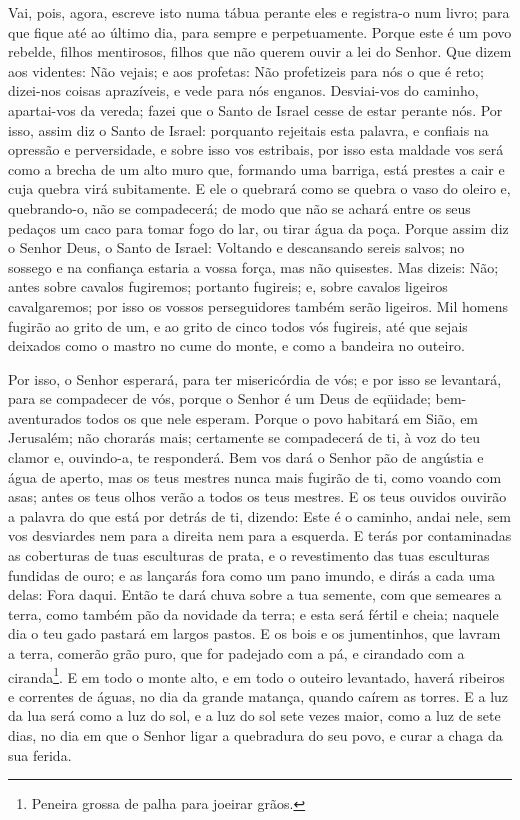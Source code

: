 Vai, pois, agora, escreve isto numa tábua perante eles e
registra-o num livro; para que fique até ao último dia, para sempre
e perpetuamente. Porque este é um povo rebelde, filhos
mentirosos, filhos que não querem ouvir a lei do Senhor. Que
dizem aos videntes: Não vejais; e aos profetas: Não profetizeis para
nós o que é reto; dizei-nos coisas aprazíveis, e vede para nós
enganos. Desviai-vos do caminho, apartai-vos da vereda; fazei
que o Santo de Israel cesse de estar perante nós. Por isso,
assim diz o Santo de Israel: porquanto rejeitais esta palavra, e
confiais na opressão e perversidade, e sobre isso vos estribais,
por isso esta maldade vos será como a brecha de um alto muro
que, formando uma barriga, está prestes a cair e cuja quebra virá
subitamente. E ele o quebrará como se quebra o vaso do oleiro
e, quebrando-o, não se compadecerá; de modo que não se achará entre
os seus pedaços um caco para tomar fogo do lar, ou tirar água da
poça. Porque assim diz o Senhor Deus, o Santo de Israel:
Voltando e descansando sereis salvos; no sossego e na confiança
estaria a vossa força, mas não quisestes. Mas dizeis: Não;
antes sobre cavalos fugiremos; portanto fugireis; e, sobre cavalos
ligeiros cavalgaremos; por isso os vossos perseguidores também serão
ligeiros. Mil homens fugirão ao grito de um, e ao grito de
cinco todos vós fugireis, até que sejais deixados como o mastro no
cume do monte, e como a bandeira no outeiro.

Por isso, o Senhor esperará, para ter misericórdia de vós; e por
isso se levantará, para se compadecer de vós, porque o Senhor é um
Deus de eqüidade; bem-aventurados todos os que nele esperam.
Porque o povo habitará em Sião, em Jerusalém; não chorarás
mais; certamente se compadecerá de ti, à voz do teu clamor e,
ouvindo-a, te responderá. Bem vos dará o Senhor pão de
angústia e água de aperto, mas os teus mestres nunca mais fugirão de
ti, como voando com asas; antes os teus olhos verão a todos os teus
mestres. E os teus ouvidos ouvirão a palavra do que está por
detrás de ti, dizendo: Este é o caminho, andai nele, sem vos
desviardes nem para a direita nem para a esquerda. E terás
por contaminadas as coberturas de tuas esculturas de prata, e o
revestimento das tuas esculturas fundidas de ouro; e as lançarás
fora como um pano imundo, e dirás a cada uma delas: Fora daqui.
Então te dará chuva sobre a tua semente, com que semeares a
terra, como também pão da novidade da terra; e esta será fértil e
cheia; naquele dia o teu gado pastará em largos pastos. E os
bois e os jumentinhos, que lavram a terra, comerão grão puro, que
for padejado com a pá, e cirandado com a ciranda\footnote{Peneira
grossa de palha para joeirar grãos.}. E em todo o monte alto,
e em todo o outeiro levantado, haverá ribeiros e correntes de águas,
no dia da grande matança, quando caírem as torres. E a luz da
lua será como a luz do sol, e a luz do sol sete vezes maior, como a
luz de sete dias, no dia em que o Senhor ligar a quebradura do seu
povo, e curar a chaga da sua ferida.

